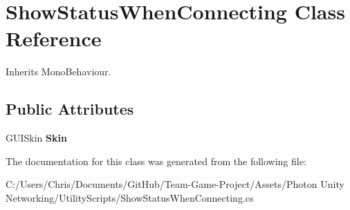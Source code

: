 \hypertarget{class_show_status_when_connecting}{}\section{Show\+Status\+When\+Connecting Class Reference}
\label{class_show_status_when_connecting}


Inherits Mono\+Behaviour.

\subsection*{Public Attributes}
\begin{DoxyCompactItemize}
\item 
G\+U\+I\+Skin {\bfseries Skin}\hypertarget{class_show_status_when_connecting_a8e289890414197e62154adeae8d2d679}{}\label{class_show_status_when_connecting_a8e289890414197e62154adeae8d2d679}

\end{DoxyCompactItemize}


The documentation for this class was generated from the following file\+:\begin{DoxyCompactItemize}
\item 
C\+:/\+Users/\+Chris/\+Documents/\+Git\+Hub/\+Team-\/\+Game-\/\+Project/\+Assets/\+Photon Unity Networking/\+Utility\+Scripts/Show\+Status\+When\+Connecting.\+cs\end{DoxyCompactItemize}
